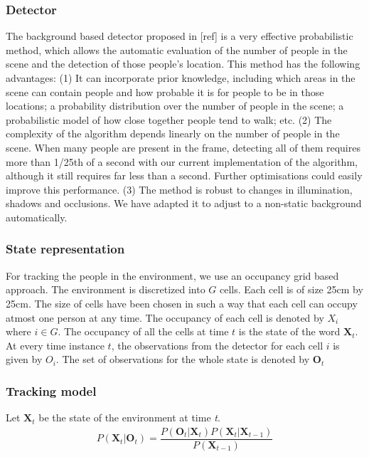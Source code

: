 \subsubsection{Detector}
The background based detector proposed in [ref] is a very effective probabilistic method, which allows the automatic evaluation of the number of people in the scene and the detection of those people’s location. This method has the following advantages: (1) It can incorporate prior knowledge, including which areas in the scene can contain people and how probable it is for people to be in those locations; a probability distribution over the number of people in the scene; a probabilistic model of how close
together people tend to walk; etc. (2) The complexity of the algorithm depends linearly on the number of people in the scene. When many people are present in the frame, detecting all of them requires
more than 1/25th of a second with our current implementation of the algorithm, although it still requires far less than a second. Further optimisations could easily improve this performance. (3) The method is robust to changes in illumination, shadows and occlusions. We have adapted it to adjust to a non-static background automatically.

\subsubsection{State representation}

For tracking the people in the environment, we use an occupancy grid based approach. The environment is discretized into $G$ cells. Each cell is of size 25cm by 25cm. The size of cells have been chosen in such a way that each cell can occupy atmost one person at any time. The occupancy of each cell is denoted by $X_{i}$ where $i \in G$. The occupancy of all the cells at time $t$ is the state of the word $\textbf{X}_{t}$. At every time instance $t$, the observations from the detector for each cell $i$ is given by $O_{i}$. The set of observations for the whole state is denoted by $\textbf{O}_{t}$ 

\subsubsection{Tracking model}

Let $\textbf{X}_{t}$ be the state of the environment at time \textit{t}.
\begin{align}
P(\textbf{X}_{t} | \textbf{O}_{t}) = \dfrac{P(\textbf{O}_{t} | \textbf{X}_{t}) P(\textbf{X}_{t}|\textbf{X}_{t-1})} {P(\textbf{X}_{t-1})}
\end{align} 


